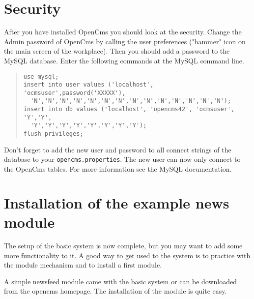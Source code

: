 \section{Security}
After you have installed OpenCms you should look at the security.
Change the Admin password of OpenCms by calling the user
preferences ("hammer" icon on the main screen of the workplace).
Then you should add a password to the MySQL database. Enter the following
commands
at the MySQL command line.\\

\begin{quote}
\begin{verbatim}
use mysql;
insert into user values ('localhost', 'ocmsuser',password('XXXXX'),
  'N','N','N','N','N','N','N','N','N','N','N','N','N','N');
insert into db values ('localhost', 'opencms42', 'ocmsuser', 'Y','Y',
  'Y','Y','Y','Y','Y','Y','Y','Y');
flush privileges;
\end{verbatim}
\end{quote}

Don't forget to add the new user and password to all connect
strings of the database to your \texttt{opencms.properties}. The
new user can now only connect to the OpenCms tables. For more
information see the MySQL documentation.

\section{Installation of the example news module}

The setup of the basic system is now complete, but you may want to
add some more functionality to it. A good way to get used to the
system is to practice with the module mechanism and to install a
first module.

A simple newsfeed module came with the basic system or can be
downloaded from the opencms homepage. The installation of the
module is quite easy.

